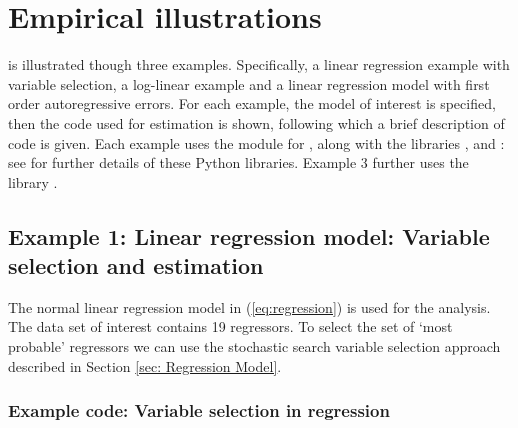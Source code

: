 \documentclass[article]{jss}
\begin{document}
\section{Empirical illustrations}
\label{sec:Empirical-Illustrations}

 is illustrated though three examples. Specifically, a
linear regression example with variable selection, a log-linear
example and a linear regression model with first order autoregressive
errors.  For each example, the model of interest is specified, then
the code used for estimation is shown, following which a brief
description of code is given. Each example uses the module for
, along with the  libraries ,
 and : see \citet{NumpyScipy, Matplotlib}
for further details of these Python libraries.  Example 3 further uses
the library .


\subsection{Example 1: Linear regression model: Variable selection and
  estimation}

The normal linear regression model in (\ref{eq:regression}) is used
for the analysis.  The data set of interest contains 19 regressors. To
select the set of `most probable' regressors we can use the stochastic
search variable selection approach described in Section \ref{sec:
  Regression Model}.

\subsubsection{Example code: Variable selection in regression}
\end{document}
